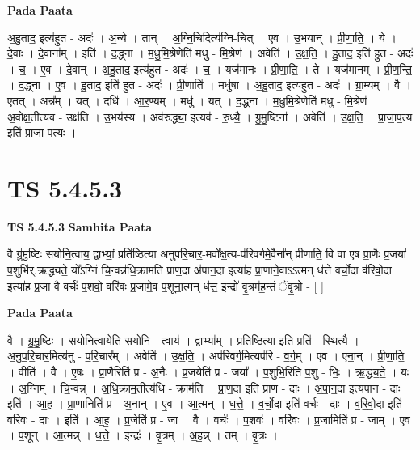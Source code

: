 \documentclass[17pt]{extarticle}
\begin{document}
\textbf{Pada Paata} \newline

अ॒हु॒ताद॒ इत्य॑हुत - अदः॑ । अ॒न्ये । तान् । अ॒ग्नि॒चिदित्य॑ग्नि-चित् । ए॒व । उ॒भयान्॑ । प्री॒णा॒ति॒ । ये । दे॒वाः । दे॒वाना᳚म् । इति॑ । द॒द्ध्ना । म॒धु॒मि॒श्रेणेति॑ मधु - मि॒श्रेण॑ । अवेति॑ । उ॒क्ष॒ति॒ । हु॒ताद॒ इति॑ हुत - अदः॑ । च॒ । ए॒व । दे॒वान् । अ॒हु॒ताद॒ इत्य॑हुत - अदः॑ । च॒ । यज॑मानः । प्री॒णा॒ति॒ । ते । यज॑मानम् । प्री॒ण॒न्ति॒ । द॒द्ध्ना । ए॒व । हु॒ताद॒ इति॑ हुत - अदः॑ । प्री॒णाति॑ । मधु॑षा । अ॒हु॒ताद॒ इत्य॑हुत - अदः॑ । ग्रा॒म्यम् । वै । ए॒तत् । अन्न᳚म् । यत् । दधि॑ । आ॒र॒ण्यम् । मधु॑ । यत् । द॒द्ध्ना । म॒धु॒मि॒श्रेणेति॑ मधु - मि॒श्रेण॑ । अ॒वोक्ष॒तीत्य॑व - उक्ष॑ति । उ॒भय॑स्य । अव॑रुद्ध्या॒ इत्यव॑ - रु॒ध्यै॒ । ग्रु॒मु॒ष्टिना᳚ । अवेति॑ । उ॒क्ष॒ति॒ । प्रा॒जा॒प॒त्य इति॑ प्राजा-प॒त्यः ।  \newline




\section*{ TS 5.4.5.3 }

\textbf{TS 5.4.5.3 } \newline
\textbf{Samhita Paata} \newline

वै ग्रु॑मु॒ष्टिः स॑योनि॒त्वाय॒ द्वाभ्यां॒ प्रति॑ष्ठित्या अनुपरि॒चार॒-मवो᳚क्ष॒त्य-प॑रिवर्गमे॒वैना᳚न् प्रीणाति॒ वि वा ए॒ष प्रा॒णैः प्र॒जया॑ प॒शुभि॑र्.ऋद्ध्यते॒ यो᳚ऽग्निं चि॒न्वन्न॑धि॒क्राम॑ति प्राण॒दा अ॑पान॒दा इत्या॑ह प्रा॒णाने॒वाऽऽत्मन् ध॑त्ते वर्चो॒दा व॑रिवो॒दा इत्या॑ह प्र॒जा वै वर्चः॑ प॒शवो॒ वरि॑वः प्र॒जामे॒व प॒शूना॒त्मन् ध॑त्त॒ इन्द्रो॑ वृ॒त्रम॑ह॒न्तं ॅवृ॒त्रो - [  ] \newline

\textbf{Pada Paata} \newline

वै । ग्रु॒मु॒ष्टिः । स॒यो॒नि॒त्वायेति॑ सयोनि - त्वाय॑ । द्वाभ्या᳚म् । प्रति॑ष्ठित्या॒ इति॒ प्रति॑ - स्थि॒त्यै॒ । अ॒नु॒प॒रि॒चार॒मित्य॑नु - प॒रि॒चार᳚म् । अवेति॑ । उ॒क्ष॒ति॒ । अप॑रिवर्ग॒मित्यप॑रि - व॒र्ग॒म् । ए॒व । ए॒ना॒न् । प्री॒णा॒ति॒ । वीति॑ । वै । ए॒षः । प्रा॒णैरिति॑ प्र - अ॒नैः । प्र॒जयेति॑ प्र - जया᳚ । प॒शुभि॒रिति॑ प॒शु - भिः॒ । ऋ॒द्ध्य॒ते॒ । यः । अ॒ग्निम् । चि॒न्वन्न् । अ॒धि॒क्राम॒तीत्य॑धि - क्राम॑ति । प्रा॒ण॒दा इति॑ प्राण - दाः । अ॒पा॒न॒दा इत्य॑पान - दाः । इति॑ । आ॒ह॒ । प्रा॒णानिति॑ प्र - अ॒नान् । ए॒व । आ॒त्मन् । ध॒त्ते॒ । व॒र्चो॒दा इति॑ वर्चः - दाः । व॒रि॒वो॒दा इति॑ वरिवः - दाः । इति॑ । आ॒ह॒ । प्र॒जेति॑ प्र - जा । वै । वर्चः॑ । प॒शवः॑ । वरि॑वः । प्र॒जामिति॑ प्र - जाम् । ए॒व । प॒शून् । आ॒त्मन्न् । ध॒त्ते॒ । इन्द्रः॑ । वृ॒त्रम् । अ॒ह॒न्न् । तम् । वृ॒त्रः ।  \newline
\end{document}
